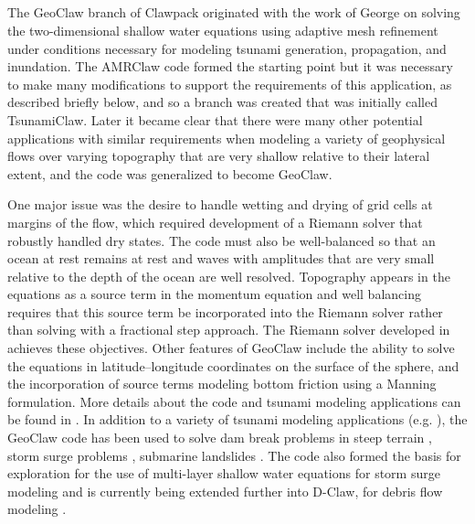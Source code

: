 %
%
%

\subsection{\geoclaw} 


The GeoClaw branch of Clawpack originated with the work of George
\cite{dgeorge:master, dgeorge:phd, dgeorge:jcp} on solving the
two-dimensional shallow water equations using adaptive mesh refinement under
conditions necessary for modeling tsunami generation, propagation, and
inundation.
The AMRClaw code formed the starting point but it was necessary to make many 
modifications to support the requirements of this application, as described
briefly below, and so a branch was created that was initially called
TsunamiClaw.  Later it became clear that there were many other potential
applications with similar requirements when modeling a variety of
geophysical flows over varying topography that are very shallow 
relative to their lateral extent,
and the code was generalized to become GeoClaw.  

One major issue was the desire to handle wetting and drying of grid cells at
margins of the flow, which required development of a Riemann solver that
robustly handled dry states.  The code must also be well-balanced so that an
ocean at rest remains at rest and waves with amplitudes that are very small
relative to the depth of the ocean are well resolved.  Topography appears in
the equations as a source term in the momentum equation and well balancing
requires that this source term be incorporated into the Riemann solver
rather than solving with a fractional step approach.  The Riemann solver
developed in \cite{dgeorge:phd, dgeorge:jcp} achieves these objectives.
Other features of GeoClaw include the ability to solve the equations in
latitude--longitude coordinates on the surface of the sphere, and the
incorporation of source terms modeling bottom friction using a Manning
formulation.
More details about the code and tsunami modeling applications can be found
in \cite{BergerGeorgeLeVequeMandli:awr11, LeVequeGeorgeBerger:an11}. 
In addition to a variety of tsunami modeling applications (e.g. \cite{??}),
the GeoClaw code has been used to solve dam break problems in steep terrain
\cite{George:Malpasset}, storm surge problems \cite{??},
submarine landslides \cite{??}.  The code also
formed the basis for exploration for the use of 
multi-layer shallow water equations for storm surge modeling
\cite{mandli:phd, ??} and is currently being extended further into D-Claw,
for debris flow modeling \cite{??}.

